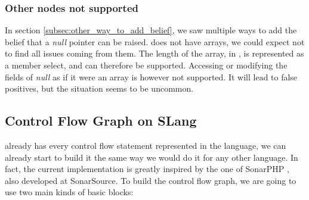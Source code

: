 \subsubsection{Other nodes not supported}
\label{subsubsec:other_nodes_not_supported}

In section \ref{subsec:other_way_to_add_belief}, we saw multiple ways to add the belief that a \emph{null} pointer can be raised. 
\slang{} does not have arrays, we could expect not to find all issues coming from them. 
The length of the array, in \slang{}, is represented as a member select, and can therefore be supported.
Accessing or modifying the fields of \emph{null} as if it were an array is however not supported.
It will lead to false positives, but the situation seems to be uncommon.

\subsection{Control Flow Graph on SLang}
\label{subsec:cfg_on_slang}

\slang{} already has every control flow statement represented in the language, we can already start to build it the same way we would do it for any other language. 
In fact, the current implementation is greatly inspired by the one of SonarPHP \cite{SonarPHP:2019:Online}, also developed at SonarSource.
To build the control flow graph, we are going to use two main kinds of basic blocks:

